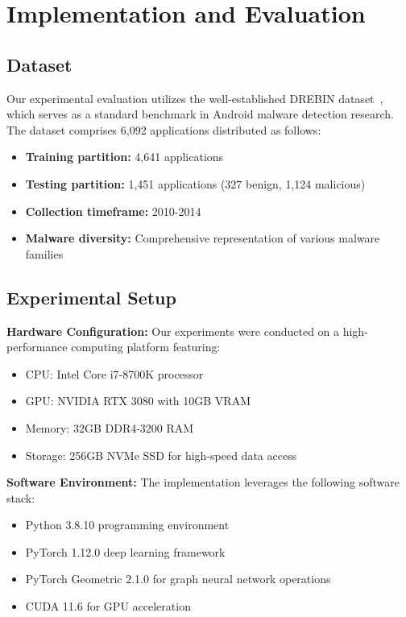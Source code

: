 \documentclass[a4paper,11pt]{article}
\begin{document}
\section{Implementation and Evaluation}
\subsection{Dataset}
Our experimental evaluation utilizes the well-established DREBIN dataset~\cite{Drebin}, which serves as a standard benchmark in Android malware detection research. The dataset comprises 6,092 applications distributed as follows:
\begin{itemize}
  \item \textbf{Training partition:} 4,641 applications
  \item \textbf{Testing partition:} 1,451 applications (327 benign, 1,124 malicious)
  \item \textbf{Collection timeframe:} 2010-2014
  \item \textbf{Malware diversity:} Comprehensive representation of various malware families
\end{itemize}

\subsection{Experimental Setup}
\textbf{Hardware Configuration:}
Our experiments were conducted on a high-performance computing platform featuring:
\begin{itemize}
  \item CPU: Intel Core i7-8700K processor
  \item GPU: NVIDIA RTX 3080 with 10GB VRAM
  \item Memory: 32GB DDR4-3200 RAM
  \item Storage: 256GB NVMe SSD for high-speed data access
\end{itemize}

\textbf{Software Environment:}
The implementation leverages the following software stack:
\begin{itemize}
  \item Python 3.8.10 programming environment
  \item PyTorch 1.12.0 deep learning framework
  \item PyTorch Geometric 2.1.0 for graph neural network operations
  \item CUDA 11.6 for GPU acceleration
\end{itemize}
\end{document}
